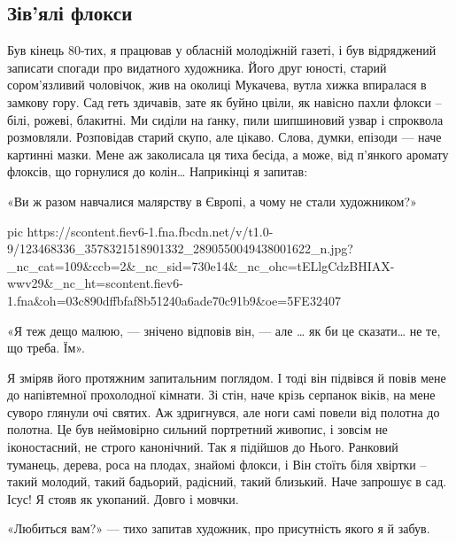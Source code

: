  
 
 

\subsection{Зів’ялі флокси}
\label{sec:02_11_2020.fb.mido_mukachevo.1.zivjali_floksy}

Був кінець 80-тих, я працював у обласній молодіжній газеті, і був відряджений
записати спогади про видатного художника. Його друг юності, старий
сором’язливий чоловічок, жив на околиці Мукачева, вутла хижка впиралася в
замкову гору. Сад геть здичавів, зате як буйно цвіли, як навісно пахли флокси
– білі, рожеві, блакитні. Ми сиділи на ґанку, пили шипшиновий узвар і
спроквола розмовляли. Розповідав старий скупо, але цікаво. Слова, думки,
епізоди --- наче картинні мазки. Мене аж заколисала ця тиха бесіда, а може, від
п’янкого аромату флоксів, що горнулися до колін… Наприкінці я запитав:

«Ви ж разом навчалися малярству в Європі, а чому не стали художником?»

\ifcmt
pic https://scontent.fiev6-1.fna.fbcdn.net/v/t1.0-9/123468336_3578321518901332_2890550049438001622_n.jpg?_nc_cat=109&ccb=2&_nc_sid=730e14&_nc_ohc=tELlgCdzBHIAX-wwv29&_nc_ht=scontent.fiev6-1.fna&oh=03c890dffbfaf8b51240a6ade70c91b9&oe=5FE32407
\fi

«Я теж дещо малюю, --- знічено відповів він, --- але … як би це сказати… не те, що треба. Їм».

Я зміряв його протяжним запитальним поглядом. І тоді він підвівся й повів мене
до напівтемної прохолодної кімнати. Зі стін, наче крізь серпанок віків, на
мене суворо глянули очі святих. Аж здригнувся, але ноги самі повели від
полотна до полотна. Це був неймовірно сильний портретний живопис, і зовсім не
іконостасний, не строго канонічний. Так я підійшов до Нього. Ранковий
туманець, дерева, роса на плодах, знайомі флокси, і Він стоїть біля хвіртки –
такий молодий, такий бадьорий, радісний, такий близький. Наче запрошує в сад.
Ісус! Я стояв як укопаний. Довго і мовчки.

«Любиться вам?» --- тихо запитав художник, про присутність якого я й забув.

